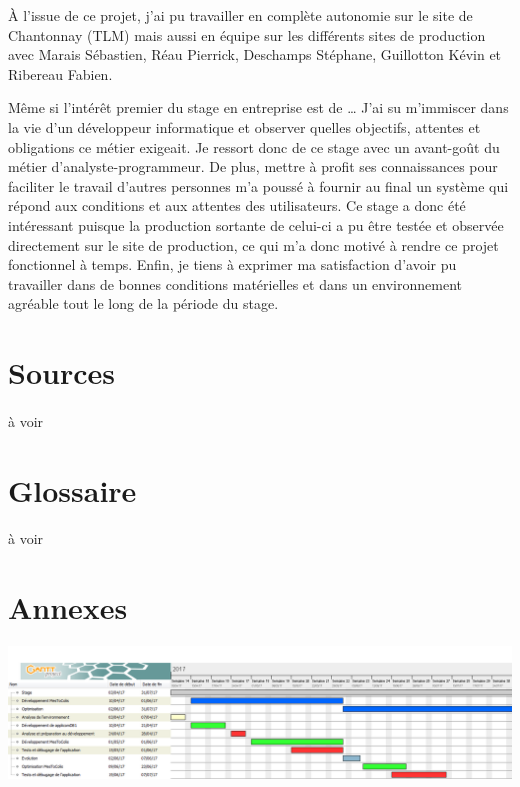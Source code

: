 \documentclass[a4paper,12pt]{extarticle}
\begin{document}
À l’issue de ce projet, j’ai pu travailler en complète autonomie sur le site de Chantonnay (TLM) mais aussi en équipe sur les différents sites de production avec Marais Sébastien, Réau Pierrick, Deschamps Stéphane, Guillotton Kévin et Ribereau Fabien.

Même si l'intérêt premier du stage en entreprise est de …
J’ai su m'immiscer dans la vie d’un développeur informatique et observer quelles objectifs, attentes et obligations ce métier exigeait. Je ressort donc de ce stage avec un avant-goût du métier d’analyste-programmeur.
De plus, mettre à profit ses connaissances pour faciliter le travail d’autres personnes m’a poussé à fournir au final un système qui répond aux conditions et aux attentes des utilisateurs. Ce stage a donc été intéressant puisque la production sortante de celui-ci a pu être testée et observée directement sur le site de production, ce qui m’a donc motivé à rendre ce projet fonctionnel à temps.
Enfin, je tiens à exprimer ma satisfaction d’avoir pu travailler dans de bonnes conditions matérielles et dans un environnement agréable tout le long de la période du stage.


	\clearpage
	
	\section{Sources}
		\paragraph{}
			à voir\\
	
	\section{Glossaire}
		\paragraph{}
			à voir\\
	\clearpage
	
	\section{Annexes}
		\begin{center}	\centerline{\includegraphics[scale=0.35,angle=270]{DiagrammeDeGantt}}
		\end{center}
\end{document}
